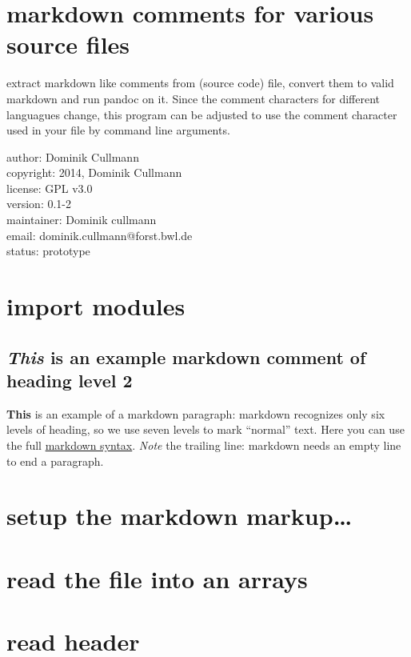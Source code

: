 \documentclass[twoside]{article}
\begin{document}
\section{markdown comments for various source files}

extract markdown like comments from (source code) file, convert them to
valid markdown and run pandoc on it. Since the comment characters for
different languagues change, this program can be adjusted to use the
comment character used in your file by command line arguments.

author: Dominik Cullmann\\ copyright: 2014, Dominik Cullmann\\ license:
GPL v3.0\\ version: 0.1-2\\ maintainer: Dominik cullmann\\ email:
dominik.cullmann@forst.bwl.de\\ status: prototype

\section{import modules}

\subsection{\emph{This} is an example markdown comment of heading level
2}

\textbf{This} is an example of a markdown paragraph: markdown recognizes
only six levels of heading, so we use seven levels to mark ``normal''
text. Here you can use the full
\href{http://daringfireball.net/projects/markdown/syntax}{markdown
syntax}. \emph{Note} the trailing line: markdown needs an empty line to
end a paragraph.

\section{setup the markdown markup\ldots{}}

\section{read the file into an arrays}

\section{read header}
\end{document}
